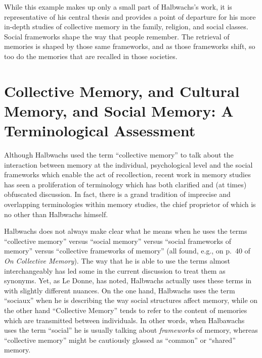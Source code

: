 While this example makes up only a small part of Halbwachs's work, it is
representative of his central thesis and provides a point of departure
for his more in-depth studies of collective memory in the family,
religion, and social classes. Social frameworks shape the way that
people remember. The retrieval of memories is shaped by those same
frameworks, and as those frameworks shift, so too do the memories that
are recalled in those societies.

\hypertarget{collective-memory-and-cultural-memory-and-social-memory-a-terminological-assessment}{%
\section{Collective Memory, and Cultural Memory, and Social Memory: A
Terminological
Assessment}\label{collective-memory-and-cultural-memory-and-social-memory-a-terminological-assessment}}

Although Halbwachs used the term ``collective memory'' to talk about the
interaction between memory at the individual, psychological level and
the social frameworks which enable the act of recollection, recent work
in memory studies has seen a proliferation of terminology which has both
clarified and (at times) obfuscated discussion. In fact, there is a
grand tradition of imprecise and overlapping terminologies within memory
studies, the chief proprietor of which is no other than Halbwachs
himself.

Halbwachs does not always make clear what he means when he uses the
terms ``collective memory'' versus ``social memory'' versus ``social
frameworks of memory'' versus ``collective frameworks of memory'' (all
found, e.g., on p.~40 of \emph{On Collective
Memory}).\autocite{halbwachs1992} The way that he is able to use the
terms almost interchangeably has led some in the current discussion to
treat them as synonyms.\autocite[Anthony Le Donne observes, ``In fact,
they are currently used synonymously with such frequency that their
nuances vary from author to author.''][42 n.8]{ledonne2009} Yet, as Le
Donne, has noted, Halbwachs actually uses these terms in with slightly
different nuances. On the one hand, Halbwachs uses the term ``sociaux''
when he is describing the way social structures affect memory, while on
the other hand ``Collective Memory'' tends to refer to the content of
memories which are transmitted between individuals.\autocite[42
n.8]{ledonne2009} In other words, when Halbawachs uses the term
``social'' he is usually talking about \emph{frameworks} of memory,
whereas ``collective memory'' might be cautiously glossed as ``common''
or ``shared'' memory.\autocite[As Hübenthal puts it, ``The difference
{[}between social and collective memory{]} lies in the perspective:
\emph{social memory} is using the framework, \emph{collective memory} is
establishing it.''][180]{hubenthal_carstens-hasselbalch2012}
